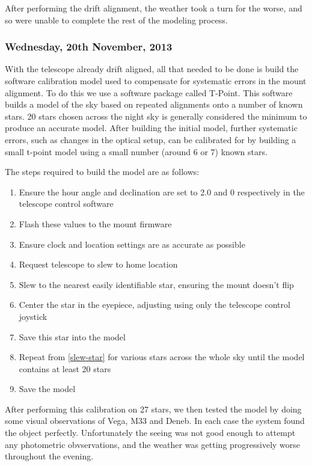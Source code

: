 After performing the drift alignment, the weather took a turn for the worse, and so were unable to complete the rest of the modeling process.

\subsubsection*{Wednesday, 20th November, 2013}

With the telescope already drift aligned, all that needed to be done is build the software calibration model used to compensate for systematic errors in the mount alignment. To do this we use a software package called T-Point. This software builds a model of the sky based on repeated alignments onto a number of known stars. 20 stars chosen across the night sky is generally considered the minimum to produce an accurate model. After building the initial model, further systematic errors, such as changes in the optical setup, can be calibrated for by building a small t-point model using a small number (around 6 or 7) known stars.

The steps required to build the model are as follows:
\begin{enumerate}
  \item Ensure the hour angle and declination are set to 2.0 and 0 respectively in the telescope control software
  \item Flash these values to the mount firmware
  \item Ensure clock and location settings are as accurate as possible
  \item Request telescope to slew to home location
  \item \label{slew-star}Slew to the nearest easily identifiable star, ensuring the mount doesn't flip
  \item Center the star in the eyepiece, adjusting using only the telescope control joystick
  \item Save this star into the model
  \item Repeat from \ref{slew-star} for various stars across the whole sky until the model contains at least 20 stars
  \item Save the model
\end{enumerate}

After performing this calibration on 27 stars, we then tested the model by doing some visual observations of Vega, M33 and Deneb. In each case the system found the object perfectly. Unfortunately the seeing was not good enough to attempt any photometric obvservations, and the weather was getting progressively worse throughout the evening.

